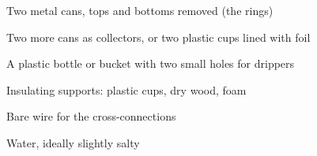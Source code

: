 



\begin{materials}
\item Two metal cans, tops and bottoms removed (the rings)
\item Two more cans as collectors, or two plastic cups lined with foil
\item A plastic bottle or bucket with two small holes for drippers
\item Insulating supports: plastic cups, dry wood, foam
\item Bare wire for the cross-connections
\item Water, ideally slightly salty
\end{materials}

